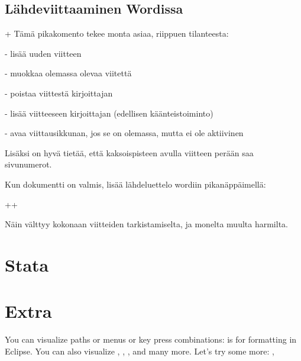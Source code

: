 \documentclass[a5paper,9pt]{scrartcl}
\begin{document}
    \subsection{Lähdeviittaaminen Wordissa}
    
    +
    Tämä pikakomento tekee monta asiaa, riippuen tilanteesta:
    
    - lisää uuden viitteen
    
    - muokkaa olemassa olevaa viitettä
    
    - poistaa viittestä kirjoittajan
    
    - lisää viitteeseen kirjoittajan (edellisen käänteistoiminto)
    
    - avaa viittausikkunan, jos se on olemassa, mutta ei ole aktiivinen
    
    
    Lisäksi on hyvä tietää, että kaksoispisteen \keys{:} avulla viitteen perään saa sivunumerot.
    
    Kun dokumentti on valmis, lisää lähdeluettelo wordiin pikanäppäimellä:
    
    ++
    
    Näin välttyy kokonaan viitteiden tarkistamiselta, ja monelta muulta harmilta.
    
    \section{Stata}
    
    
    \section{Extra}
    You can visualize paths 
    or menus  or key
    press combinations:  is for formatting
    in Eclipse.
    You can also visualize \keys{\tab}, \keys{\capslock}, \keys{\Space}, 
    \keys{\arrowkeyup} and many more.
    Let's try some more: ,  
\end{document}
